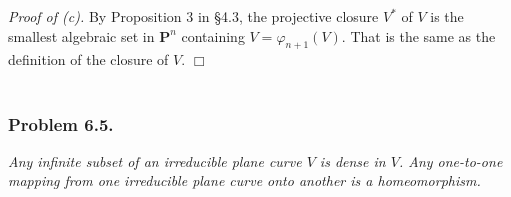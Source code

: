 \documentclass{article}
\begin{document}
\emph{Proof of (c).}
  By Proposition 3 in \S 4.3,
  the projective closure $V^{*}$ of $V$ is the smallest algebraic set in $\mathbf{P}^{n}$
  containing $V = \varphi_{n+1}(V)$.
  That is the same as the definition of the closure of $V$.
$\Box$ \\\\






\subsubsection*{Problem 6.5.}
\emph{Any infinite subset of an irreducible plane curve $V$ is dense in $V$.
Any one-to-one mapping from one irreducible plane curve onto another is a homeomorphism.} \\
\end{document}
